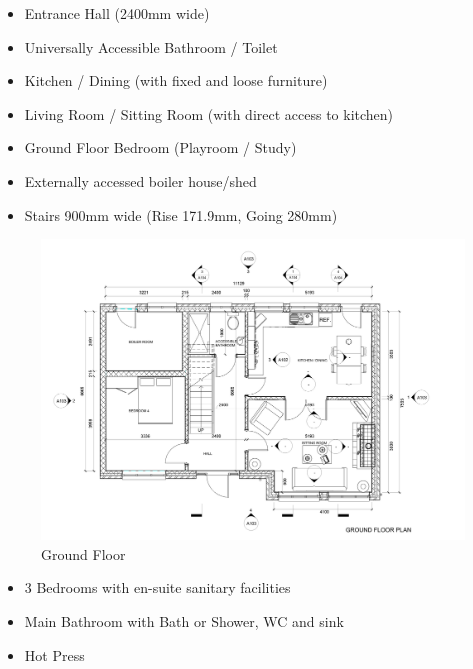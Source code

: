 \begin{itemize}
	\item Entrance Hall (2400mm wide)
	\item Universally Accessible Bathroom / Toilet
	\item Kitchen / Dining (with fixed and loose furniture)
	\item Living Room / Sitting Room (with direct access to kitchen)
	\item Ground Floor Bedroom (Playroom / Study)
	\item Externally accessed boiler house/shed
	\item Stairs 900mm wide (Rise 171.9mm, Going 280mm)
\end{itemize}



\begin{figure}
	\centering
	\includegraphics[width=1.0\linewidth]{./Assignments/img/P01GroundFloorLevel.jpg}
	\caption{Ground Floor}
	\label{fig:p01groundfloorlevel}
\end{figure}


\newpage

\begin{itemize}
	\item 3 Bedrooms with en-suite sanitary facilities
	\item Main Bathroom with Bath or Shower, WC and sink
	\item Hot Press
\end{itemize}




